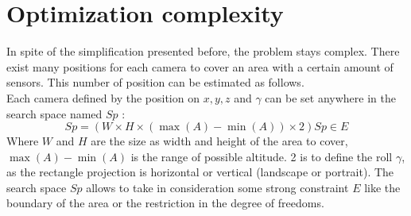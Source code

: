 %    


 
 \section{Optimization complexity} \label{sec:OptimizationComplexity}
 
In spite of the simplification presented before, the problem stays complex. There exist many positions for each camera to cover an area with a certain amount of sensors. This number of position can be estimated as follows.\\   
Each camera defined by the position on $x, y, z $ and $ \gamma$ can be set anywhere in the search space named $Sp$ : 
\begin{equation}\label{eq:SearchSpace}
 Sp=(W\times H \times ( \max(A)-\min(A)) \times 2 )  Sp \in E 
\end{equation}
Where $W$ and $H$ are the size as width and height of the area to cover, $\max(A)-\min(A)$  is the range  of possible altitude. 2 is to define the roll $\gamma$, as the rectangle projection is horizontal or vertical (landscape or portrait). The search space $Sp$ allows to take in consideration some strong constraint $E$ like the boundary of the area or the restriction in the degree of freedoms.

